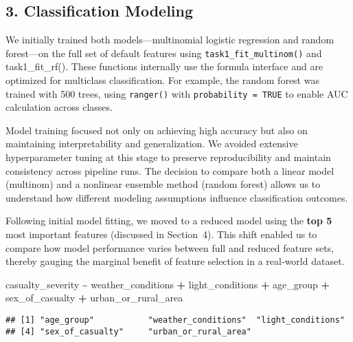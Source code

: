 \documentclass[
]{article}
\newenvironment{Shaded}{\begin{snugshade}}{\end{snugshade}}
\newcommand{\NormalTok}[1]{#1}
\newcommand{\SpecialCharTok}[1]{\textcolor[rgb]{0.81,0.36,0.00}{\textbf{#1}}}
\begin{document}
\subsection{3. Classification Modeling}\label{classification-modeling}

We initially trained both models---multinomial logistic regression and
random forest---on the full set of default features using
\texttt{task1\_fit\_multinom()} and task1\_fit\_rf(). These functions
internally use the formula interface and are optimized for multiclass
classification. For example, the random forest was trained with 500
trees, using \texttt{ranger()} with \texttt{probability\ =\ TRUE} to
enable AUC calculation across classes.

Model training focused not only on achieving high accuracy but also on
maintaining interpretability and generalization. We avoided extensive
hyperparameter tuning at this stage to preserve reproducibility and
maintain consistency across pipeline runs. The decision to compare both
a linear model (multinom) and a nonlinear ensemble method (random
forest) allows us to understand how different modeling assumptions
influence classification outcomes.

Following initial model fitting, we moved to a reduced model using the
\textbf{top 5} most important features (discussed in Section~4). This
shift enabled us to compare how model performance varies between full
and reduced feature sets, thereby gauging the marginal benefit of
feature selection in a real‑world dataset.

\begin{Shaded}
\begin{Highlighting}[]
\NormalTok{casualty\_severity }\SpecialCharTok{\textasciitilde{}}\NormalTok{ weather\_conditions }\SpecialCharTok{+}\NormalTok{ light\_conditions }\SpecialCharTok{+}\NormalTok{ age\_group }\SpecialCharTok{+}
\NormalTok{  sex\_of\_casualty }\SpecialCharTok{+}\NormalTok{ urban\_or\_rural\_area}
\end{Highlighting}
\end{Shaded}

\begin{Shaded}
\end{Shaded}

\begin{verbatim}
## [1] "age_group"           "weather_conditions"  "light_conditions"   
## [4] "sex_of_casualty"     "urban_or_rural_area"
\end{verbatim}
\end{document}
